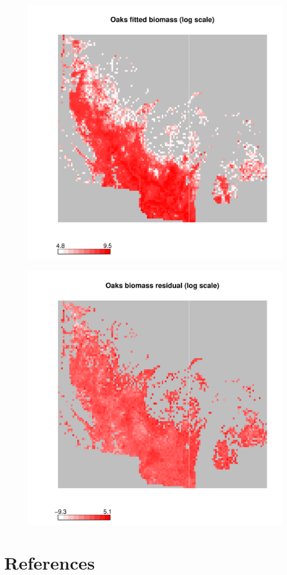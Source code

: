 \documentclass[authoryear, review, 11pt]{elsarticle}
\begin{document}
\begin{figure}
	\begin{center}
	\includegraphics[width=5in]{../../figures/Oaks-biomass-fitted.pdf}
	\end{center}
\end{figure}

\begin{figure}
	\begin{center}
	\includegraphics[width=5in]{../../figures/Oaks-biomass-residual.pdf}
	\end{center}
\end{figure}

\section{References}
%
%
\end{document}

